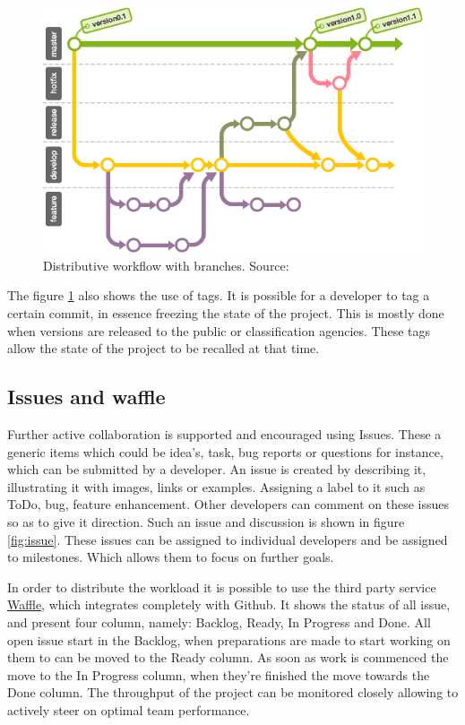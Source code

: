 \documentclass[fleqn,10pt]{SelfArx} %
\begin{document}
\begin{figure}[ht]\centering
	\includegraphics[width=\textwidth/2]{../images/stepup.png}
	\caption{Distributive workflow with branches. Source: \citeauthor{backlog_branching_2015}\cite{backlog_branching_2015} }\label{fig:branchworkflow}
\end{figure}

The figure \ref{fig:branchworkflow} also shows the use of tags. It is possible for a developer to tag a certain commit, in essence freezing the state of the project. This is mostly done when versions are released to the public or classification agencies. These tags allow the  state of the project to be recalled at that time.

\subsection{Issues and waffle}
Further active collaboration is supported and encouraged using Issues. These a generic items which could be idea's, task, bug reports or questions for instance, which can be submitted by a developer. An issue is created by describing it, illustrating it with images, links or examples. Assigning a label to it such as ToDo, bug, feature enhancement. Other developers can comment on these issues so as to give it direction. Such an issue and discussion is shown in figure \ref{fig:issue}. These issues can be assigned to individual developers and be assigned to milestones. Which allows them to focus on further goals.

In order to distribute the workload it is possible to use the third party service \href{https://waffle.io}{\color{color1}Waffle}, which integrates completely with Github. It shows the status of all issue, and present four column, namely: Backlog, Ready, In Progress and Done. All open issue start in the Backlog, when preparations are made to start working on them to can be moved to the Ready column. As soon as work is commenced the move to the In Progress column, when they're finished the move towards the Done column. The throughput of the project can be monitored closely allowing to actively steer on optimal team performance. 
\end{document}
